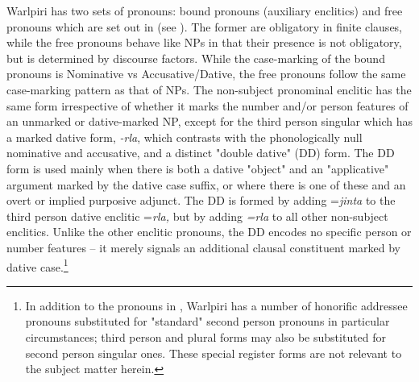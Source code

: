 \documentclass[output=paper]{../langscibook}
\begin{document}
Warlpiri has two sets of pronouns: bound pronouns (auxiliary enclitics) and free pronouns which are set out in  (see \citealt{Hale1973}). The former are obligatory in finite clauses, while the free pronouns behave like NPs in that their presence is not obligatory, but is determined by discourse factors. While the case-marking of the bound pronouns is Nominative vs Accusative/Dative, the free pronouns follow the same case-marking pattern as that of NPs. The non-subject pronominal enclitic has the same form irrespective of whether it marks the number and/or person features of an unmarked or dative-marked NP, except for the third person singular which has a marked dative form, \textit{{}-rla}, which contrasts with the phonologically null nominative and accusative, and a distinct "double dative" (DD) form. The DD form is used mainly when there is both a dative "object" and an "applicative" argument marked by the dative case suffix, or where there is one of these and an overt or implied purposive adjunct. The DD is formed by adding =\textit{jinta} to the third person dative enclitic =\textit{rla,} but by adding \textit{=rla} to all other non-subject enclitics. Unlike the other enclitic pronouns, the DD encodes no specific person or number features – it merely signals an additional clausal constituent marked by dative case.\footnote{In addition to the pronouns in , Warlpiri has a number of honorific addressee pronouns substituted for "standard" second person pronouns in particular circumstances; third person and plural forms may also be substituted for second person singular ones. These special register forms are not relevant to the subject matter herein.}
\end{document}
